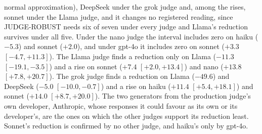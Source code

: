 normal approximation), DeepSeek under the grok judge and, among the rises,
sonnet under the Llama judge, and it changes no registered reading, since
JUDGE-ROBUST needs six of seven under every judge and Llama's reduction
survives under all five.
Under the nano judge the interval includes zero on haiku
($-5.3$) and sonnet ($+2.0$), and under gpt-4o it includes zero on sonnet
($+3.3$ $[-4.7, +11.3]$). The Llama judge finds a reduction only on Llama
($-11.3$ $[-19.1, -3.5]$) and a rise on sonnet ($+7.4$ $[+2.0, +13.4]$) and
nano ($+13.8$ $[+7.8, +20.7]$). The grok judge finds a reduction on Llama
($-49.6$) and DeepSeek ($-5.0$ $[-10.0, -0.7]$) and a rise on haiku ($+11.4$
$[+5.4, +18.1]$) and sonnet ($+14.0$ $[+8.7, +20.0]$).
The two generators from the production judge's own developer, Anthropic,
whose responses it could favour as its own or its developer's, are the ones
on which the other judges support its reduction least. Sonnet's reduction is
confirmed by no other judge, and haiku's only by gpt-4o.

